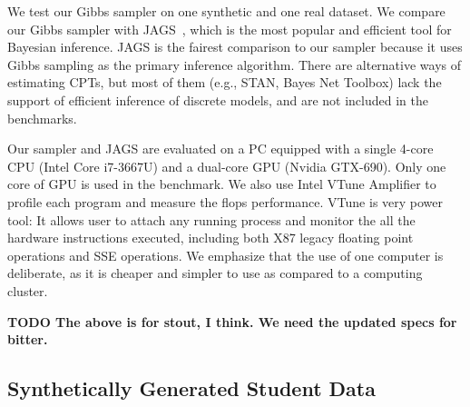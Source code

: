 \documentclass{article} %
\begin{document}
We test our Gibbs sampler on one synthetic and one real dataset.  We compare our Gibbs sampler with
JAGS~\citep{JAGS2003}, which is the most popular and efficient tool for Bayesian inference. JAGS is
the fairest comparison to our sampler because it uses Gibbs sampling as the primary inference
algorithm. There are alternative ways of estimating CPTs, but most of them (e.g., STAN, Bayes Net
Toolbox) lack the support of efficient inference of discrete models, and are not included in the
benchmarks.

Our sampler and JAGS are evaluated on a PC equipped with a single 4-core CPU (Intel Core i7-3667U)
and a dual-core GPU (Nvidia GTX-690). Only one core of GPU is used in the benchmark. We also use
Intel VTune Amplifier to profile each program and measure the flops performance. VTune is very power
tool: It allows user to attach any running process and monitor the all the hardware instructions
executed, including both X87 legacy floating point operations and SSE operations.  We emphasize that
the use of one computer is deliberate, as it is cheaper and simpler to use as compared to a
computing cluster.

\textbf{TODO The above is for stout, I think. We need the updated specs for bitter.}

\subsection{Synthetically Generated Student Data}\label{ssec:student_data}
\end{document}

